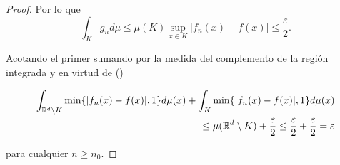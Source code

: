 \begin{proof}
    Por lo que  
    \begin{equation} \label{eq:lema3_2_integral_en_compacto_K}
        \int_K g_n d\mu 
        \leq
         \mu(K) \sup_{x \in K} |f_n(x) - f(x)| 
        \leq 
        \frac{\varepsilon}{2} .
    \end{equation}

    Acotando el primer sumando por la medida 
    del complemento de la región integrada y en virtud de 
    ()

    \begin{equation}
        \begin{split}
            \int_{\mathbb{R}^d \setminus K} \min \{ |f_n(x) - f(x)|, 1\} d\mu(x) 
            +
            \int_{K} \min \{ |f_n(x) - f(x)|, 1\} d\mu(x)  \\ \leq
            \mu(\mathbb{R}^d \setminus K) +  \frac{\varepsilon}{2}
            \leq
            \frac{\varepsilon}{2} +  \frac{\varepsilon}{2}
            = 
            \varepsilon
        \end{split}
    \end{equation}

    para cualquier $n \geq n_0$. 
\end{proof}



